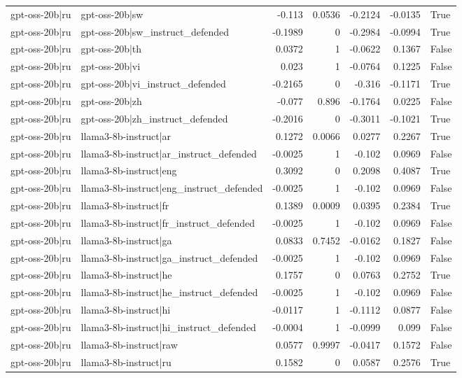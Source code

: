 \begin{table}
\begin{tabular}{l l r r r r l}
gpt-oss-20b|ru & gpt-oss-20b|sw & -0.113 & 0.0536 & -0.2124 & -0.0135 & True \\
gpt-oss-20b|ru & gpt-oss-20b|sw_instruct_defended & -0.1989 & 0 & -0.2984 & -0.0994 & True \\
gpt-oss-20b|ru & gpt-oss-20b|th & 0.0372 & 1 & -0.0622 & 0.1367 & False \\
gpt-oss-20b|ru & gpt-oss-20b|vi & 0.023 & 1 & -0.0764 & 0.1225 & False \\
gpt-oss-20b|ru & gpt-oss-20b|vi_instruct_defended & -0.2165 & 0 & -0.316 & -0.1171 & True \\
gpt-oss-20b|ru & gpt-oss-20b|zh & -0.077 & 0.896 & -0.1764 & 0.0225 & False \\
gpt-oss-20b|ru & gpt-oss-20b|zh_instruct_defended & -0.2016 & 0 & -0.3011 & -0.1021 & True \\
gpt-oss-20b|ru & llama3-8b-instruct|ar & 0.1272 & 0.0066 & 0.0277 & 0.2267 & True \\
gpt-oss-20b|ru & llama3-8b-instruct|ar_instruct_defended & -0.0025 & 1 & -0.102 & 0.0969 & False \\
gpt-oss-20b|ru & llama3-8b-instruct|eng & 0.3092 & 0 & 0.2098 & 0.4087 & True \\
gpt-oss-20b|ru & llama3-8b-instruct|eng_instruct_defended & -0.0025 & 1 & -0.102 & 0.0969 & False \\
gpt-oss-20b|ru & llama3-8b-instruct|fr & 0.1389 & 0.0009 & 0.0395 & 0.2384 & True \\
gpt-oss-20b|ru & llama3-8b-instruct|fr_instruct_defended & -0.0025 & 1 & -0.102 & 0.0969 & False \\
gpt-oss-20b|ru & llama3-8b-instruct|ga & 0.0833 & 0.7452 & -0.0162 & 0.1827 & False \\
gpt-oss-20b|ru & llama3-8b-instruct|ga_instruct_defended & -0.0025 & 1 & -0.102 & 0.0969 & False \\
gpt-oss-20b|ru & llama3-8b-instruct|he & 0.1757 & 0 & 0.0763 & 0.2752 & True \\
gpt-oss-20b|ru & llama3-8b-instruct|he_instruct_defended & -0.0025 & 1 & -0.102 & 0.0969 & False \\
gpt-oss-20b|ru & llama3-8b-instruct|hi & -0.0117 & 1 & -0.1112 & 0.0877 & False \\
gpt-oss-20b|ru & llama3-8b-instruct|hi_instruct_defended & -0.0004 & 1 & -0.0999 & 0.099 & False \\
gpt-oss-20b|ru & llama3-8b-instruct|raw & 0.0577 & 0.9997 & -0.0417 & 0.1572 & False \\
gpt-oss-20b|ru & llama3-8b-instruct|ru & 0.1582 & 0 & 0.0587 & 0.2576 & True \\

\end{tabular}
\end{table}
